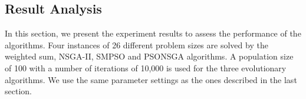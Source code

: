 \documentclass[10pt,journal,compsoc]{IEEEtran}
\begin{document}
%



\subsection{Result Analysis}\label{resultanalyssi}
In this section, we present the experiment results to assess the performance of the algorithms.
Four instances of 26 different problem sizes are solved by the weighted sum, NSGA-II, SMPSO and PSONSGA algorithms.
A population size of 100 with a number of iterations of 10,000 is used for the three evolutionary algorithms. We use the same parameter settings as the ones described in the last section.
\end{document}

